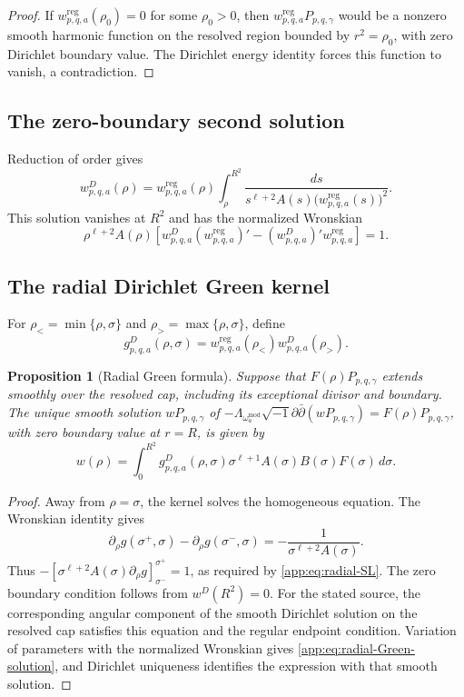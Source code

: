 \documentclass[11pt,a4paper,twoside]{article}
\numberwithin{equation}{section}
\newcommand{\ddc}{\sqrt{-1}\partial\bar\partial}
\newtheorem{proposition}[theorem]{Proposition}
\theoremstyle{definition}
\theoremstyle{remark}
\begin{document}
\begin{proof}
If \(w_{p,q,a}^{\mathrm{reg}}(\rho_0)=0\) for some \(\rho_0>0\),
then \(w_{p,q,a}^{\mathrm{reg}}P_{p,q,\gamma}\) would be a nonzero
smooth harmonic function on the resolved region bounded by
\(r^2=\rho_0\), with zero Dirichlet boundary value. The Dirichlet
energy identity forces this function to vanish, a contradiction.
\end{proof}

\subsection{The zero-boundary second solution}

Reduction of order gives
\begin{equation}\label{app:eq:wD}
w_{p,q,a}^{D}(\rho)
=w_{p,q,a}^{\mathrm{reg}}(\rho)
\int_\rho^{R^2}
\frac{ds}{s^{\ell+2}A(s)
\bigl(w_{p,q,a}^{\mathrm{reg}}(s)\bigr)^2}.
\end{equation}
This solution vanishes at \(R^2\) and has the normalized Wronskian
\[
\rho^{\ell+2}A(\rho)
\left[w_{p,q,a}^{D}(w_{p,q,a}^{\mathrm{reg}})'
-(w_{p,q,a}^{D})'w_{p,q,a}^{\mathrm{reg}}\right]=1.
\]
\subsection{The radial Dirichlet Green kernel}

For \(\rho_<=\min\{\rho,\sigma\}\) and
\(\rho_>=\max\{\rho,\sigma\}\), define
\begin{equation}\label{app:eq:radial-Green}
g_{p,q,a}^{D}(\rho,\sigma)
=w_{p,q,a}^{\mathrm{reg}}(\rho_<)w_{p,q,a}^{D}(\rho_>).
\end{equation}
\begin{proposition}[Radial Green formula]
\label{app:prop:radial-Green}
Suppose that \(F(\rho)P_{p,q,\gamma}\) extends smoothly over the
resolved cap, including its exceptional divisor and boundary.
The unique smooth solution \(wP_{p,q,\gamma}\) of
\(-\Lambda_{\omega_a^{\mathrm{mod}}}\ddc(wP_{p,q,\gamma})
=F(\rho)P_{p,q,\gamma}\), with zero boundary value at \(r=R\),
is given by
\begin{equation}\label{app:eq:radial-Green-solution}
w(\rho)=\int_0^{R^2}g_{p,q,a}^{D}(\rho,\sigma)
\sigma^{\ell+1}A(\sigma)B(\sigma)F(\sigma)\,d\sigma.
\end{equation}
\end{proposition}

\begin{proof}
Away from \(\rho=\sigma\), the kernel solves the homogeneous
equation. The Wronskian identity gives
\[
\partial_\rho g(\sigma^+,\sigma)-\partial_\rho g(\sigma^-,\sigma)
=-\frac1{\sigma^{\ell+2}A(\sigma)}.
\]
Thus \(-[\sigma^{\ell+2}A(\sigma)\partial_\rho g]_{
\sigma^-}^{\sigma^+}=1\), as required by
\eqref{app:eq:radial-SL}. The zero boundary condition follows from
\(w^D(R^2)=0\). For the stated source, the corresponding angular
component of the smooth Dirichlet solution on the resolved cap
satisfies this equation and the regular endpoint condition.
Variation of parameters with the normalized Wronskian gives
\eqref{app:eq:radial-Green-solution}, and Dirichlet uniqueness
identifies the expression with that smooth solution.
\end{proof}
\end{document}
